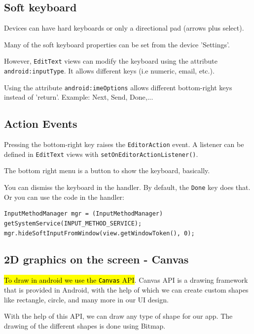 \subsection{Soft keyboard}

Devices can have hard keyboards or only a directional pad (arrows plus select).

Many of the soft keyboard properties can be set from the device 'Settings'. 

However, \texttt{EditText} views can modify the keyboard using the attribute \texttt{android:inputType}. 
It allows different keys (i.e numeric, email, etc.).

Using the attribute \texttt{android:imeOptions} allows different bottom-right keys instead of 'return'.
Example: Next, Send, Done,...

\subsection{Action Events}

Pressing the bottom-right key raises the \texttt{EditorAction} event.
A listener can be defined in \texttt{EditText} views with \texttt{setOnEditorActionListener()}. 

The bottom right menu is a button to show the keyboard, basically.

You can dismiss the keyboard in the handler. By default, the \texttt{Done} key does that. 
Or you can use the code in the handler:

\begin{lstlisting}[title=Code to hide keyboard]
InputMethodManager mgr = (InputMethodManager) getSystemService(INPUT_METHOD_SERVICE);
mgr.hideSoftInputFromWindow(view.getWindowToken(), 0);
\end{lstlisting}

\subsection{2D graphics on the screen - Canvas}
\hl{To draw in android we use the \texttt{Canvas} API}. Canvas API is a drawing 
framework that is provided in Android, with the help of which we 
can create custom shapes like rectangle, circle, and many more 
in our UI design. 

With the help of this API, we can draw any type of shape for 
our app. The drawing of the different shapes is done using Bitmap. 



